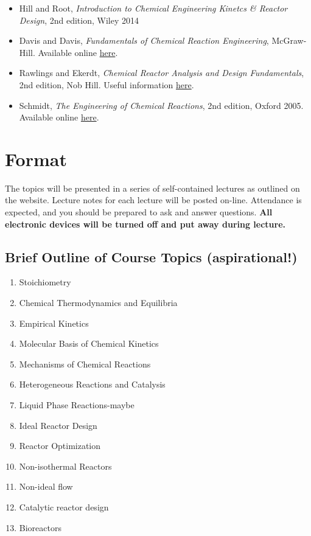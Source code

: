 \documentclass[11pt]{article}
\begin{document}
\begin{itemize}
\item Hill and Root, \emph{Introduction to Chemical Engineering Kinetcs \& Reactor Design}, 2nd edition, Wiley 2014
\item Davis and Davis, \emph{Fundamentals of Chemical Reaction Engineering}, McGraw-Hill. Available online \href{https://authors.library.caltech.edu/25070/}{here}.
\item Rawlings and Ekerdt, \emph{Chemical Reactor Analysis and Design Fundamentals}, 2nd edition, Nob Hill. Useful information \href{https://sites.engineering.ucsb.edu/\~jbraw/chemreacfun/}{here}.
\item Schmidt, \emph{The Engineering of Chemical Reactions}, 2nd edition, Oxford 2005. Available online \href{https://app.knovel.com/kn/resources/kpECRE0001/toc}{here}.
\end{itemize}
\section{Format}
\label{sec:orgb104ccf}
The topics will be presented in a series of self-contained lectures as outlined on the website. Lecture notes for each lecture will be posted on-line. Attendance is expected, and you should be prepared to ask and answer questions. \textbf{All electronic devices will be turned off and put away during lecture.}
\subsection{Brief Outline of Course Topics (aspirational!)}
\label{sec:org3c63e3e}
\begin{enumerate}
\item Stoichiometry
\item Chemical Thermodynamics and Equilibria
\item Empirical Kinetics
\item Molecular Basis of Chemical Kinetics
\item Mechanisms of Chemical Reactions
\item Heterogeneous Reactions and Catalysis
\item Liquid Phase Reactions-maybe
\item Ideal Reactor Design
\item Reactor Optimization
\item Non-isothermal Reactors
\item Non-ideal flow
\item Catalytic reactor design
\item Bioreactors
\end{enumerate}
\end{document}
